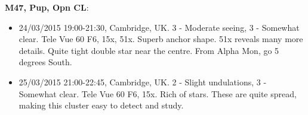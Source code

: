 {\bf M47, Pup, Opn CL}:
\begin{itemize}
\item 24/03/2015 19:00-21:30, Cambridge, UK. 3 - Moderate seeing, 3 - Somewhat clear. Tele Vue 60 F6, 15x, 51x. Superb anchor shape. 51x reveals many more details. Quite tight double star near the centre. From Alpha Mon, go 5 degrees South.
\item 25/03/2015 21:00-22:45, Cambridge, UK. 2 - Slight undulations, 3 - Somewhat clear. Tele Vue 60 F6, 15x. Rich of stars. These are quite spread, making this cluster easy to detect and study.
\end{itemize}
